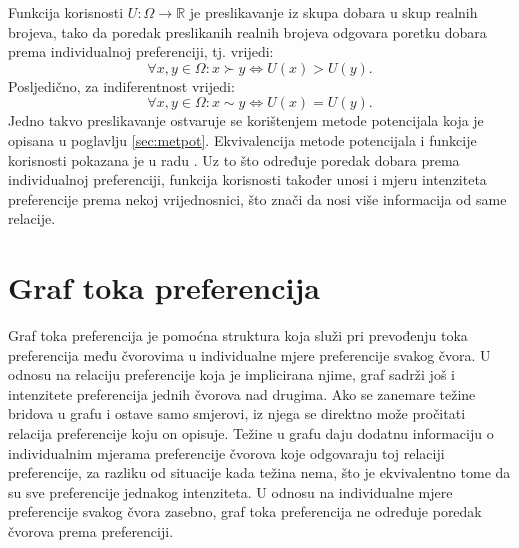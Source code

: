 \documentclass[lmodern, utf8, diplomski, numeric]{fer}
\newcommand{\q}{\left}
\newcommand{\w}{\right}
\begin{document}
  Funkcija korisnosti  $U\colon \Omega \to \mathbb{R}$ je preslikavanje iz skupa dobara u skup realnih brojeva, tako da poredak preslikanih realnih brojeva odgovara poretku dobara prema individualnoj preferenciji, tj. vrijedi:
  \begin{equation*}
    \forall x, y \in \Omega \colon x \succ y \Leftrightarrow U\q(x\w) > U\q(y\w).
  \end{equation*}
  Posljedično, za indiferentnost vrijedi:
  \begin{equation*}
    \forall x, y \in \Omega \colon x \sim y \Leftrightarrow U\q(x\w) = U\q(y\w).
  \end{equation*}
  Jedno takvo preslikavanje ostvaruje se korištenjem metode potencijala koja je opisana u poglavlju \ref{sec:metpot}.
  Ekvivalencija metode potencijala i funkcije korisnosti pokazana je u radu \citep{metpotexact}.
  Uz to što određuje poredak dobara prema individualnoj preferenciji, funkcija korisnosti također unosi i mjeru intenziteta preferencije prema nekoj vrijednosnici, što znači da nosi više informacija od same relacije.

  \section{Graf toka preferencija}
  Graf toka preferencija je pomoćna struktura koja služi pri prevođenju toka preferencija među čvorovima u individualne mjere preferencije svakog čvora.
  U odnosu na relaciju preferencije koja je implicirana njime, graf sadrži još i intenzitete preferencija jednih čvorova nad drugima.
  Ako se zanemare težine bridova u grafu i ostave samo smjerovi, iz njega se direktno može pročitati relacija preferencije koju on opisuje.
  Težine u grafu daju dodatnu informaciju o individualnim mjerama preferencije čvorova koje odgovaraju toj relaciji preferencije, za razliku od situacije kada težina nema, što je ekvivalentno tome da su sve preferencije jednakog intenziteta.
  U odnosu na individualne mjere preferencije svakog čvora zasebno, graf toka preferencija ne određuje poredak čvorova prema preferenciji.
  
\end{document}
